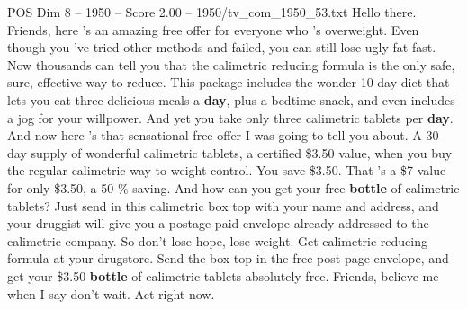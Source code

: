 \begin{textsample}{POS Dim 8 – 1950 – Score 2.00 – 1950/tv\_com\_1950\_53.txt}  \label{ex:f8_pos_012}
Hello there.
Friends, here 's an amazing free offer for everyone who 's overweight.
Even though you 've tried other methods and failed, you can still lose ugly fat fast.
Now thousands can tell you that the calimetric reducing formula is the only safe, sure, effective way to reduce.
This package includes the wonder 10-day diet that lets you eat three delicious meals a \textbf{day}, plus a bedtime snack, and even includes a jog for your willpower.
And yet you take only three calimetric tablets per \textbf{day}.
And now here 's that sensational free offer I was going to tell you about.
A 30-day supply of wonderful calimetric tablets, a certified \$3.50 value, when you buy the regular calimetric way to weight control.
You save \$3.50.
That 's a \$7 value for only \$3.50, a 50 \% saving.
And how can you get your free \textbf{bottle} of calimetric tablets?
Just send in this calimetric box top with your name and address, and your druggist will give you a postage paid envelope already addressed to the calimetric company.
So don't lose hope, lose weight.
Get calimetric reducing formula at your drugstore.
Send the box top in the free post page envelope, and get your \$3.50 \textbf{bottle} of calimetric tablets absolutely free.
Friends, believe me when I say don't wait.
Act right now.

\end{textsample}
